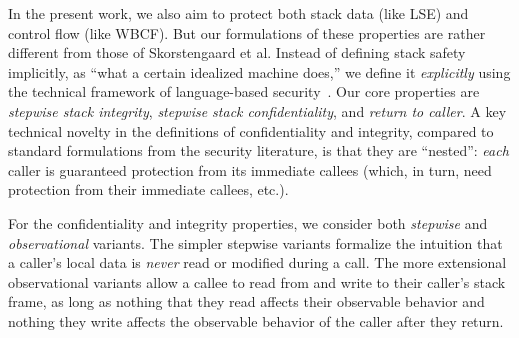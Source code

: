 \documentclass[acmsmall,review,anonymous]{acmart}\settopmatter{printfolios=true,printccs=false,printacmref=false}
\begin{document}
In the present work, we also aim to protect both stack data (like
LSE) and
control flow (like WBCF).  But our formulations of these properties are
rather different from those of Skorstengaard et al.  Instead of
defining stack safety implicitly,
as ``what a certain idealized machine does,'' we define it
\emph{explicitly} using the technical framework of language-based
security\ifaftersubmission~\citep{??}\fi.
Our core properties are \emph{stepwise stack integrity},
\emph{stepwise stack confidentiality}, and \emph{return to caller}.
%
A key technical novelty in the definitions of confidentiality and integrity,
compared to standard formulations from the security literature, is that they
are ``nested'': {\em each} caller is guaranteed protection from its
immediate callees (which, in turn, need protection from their immediate
callees, etc.).


For the confidentiality and integrity properties, we consider both {\em
  stepwise} and {\em observational} variants.  The simpler {stepwise}
variants formalize the intuition that a caller's local data is {\em never}
read or modified during a call. The more extensional observational variants
allow a callee to read from and write to their caller's stack frame, as
long as nothing that they read affects their observable behavior and nothing
they write affects the observable behavior of the caller after they return.

\end{document}
